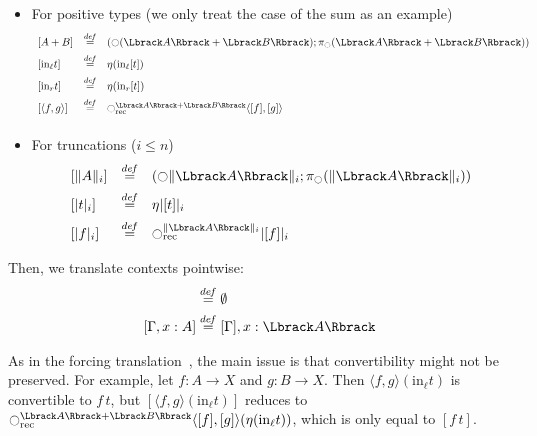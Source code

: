 \begin{itemize}
\item For positive types (we only treat the case of the sum as an example)
\[
\begin{array}{lcl}
\left[  A+B \right] &\defeq& \left( \modal(\Lbrack A \Rbrack + \Lbrack B
                        \Rbrack); \pi_\modal(\Lbrack A \Rbrack + \Lbrack B
                        \Rbrack)\right)\\[0.5em]
\left[  \mathrm{in}_\ell t \right] &\defeq& \eta (\mathrm{in}_\ell [t]) \\[0.5em]
\left[  \mathrm{in}_r t \right] &\defeq& \eta (\mathrm{in}_r [t]) \\[0.5em]
\left[ \langle f ,g\rangle\right] &\defeq& \modal_{\mathrm{rec}}^{\Lbrack A\Rbrack +
                                      \Lbrack B\Rbrack} \langle
                                      [f],[g]\rangle\\[0.5em]
\end{array}
\]
\item For truncations ($i\leqslant n$)
\[
\begin{array}{lcl}
  \left[  \|A\|_i \right] &\defeq& (\modal \| \Lbrack A\Rbrack  \|_i;
                                   \pi_\modal(\| \Lbrack A\Rbrack
                                   \|_i)) \\[0.5em]
  \left[ |t|_i \right] &\defeq& \eta |[t]|_i \\[0.5em]
  \left[ |f|_i \right] &\defeq& \modal_{\mathrm{rec}}^{\| \Lbrack
                                  A\Rbrack  \|_i} | [f] |_i
\end{array}
\]

\end{itemize}

Then, we translate contexts pointwise:
\begin{align*}
  [\emptyset] &\defeq \emptyset \\
  [\Gamma,x:A] &\defeq [\Gamma],x:\Lbrack A\Rbrack
\end{align*}

As in the forcing translation~\cite{jaber2012extending}, the main
issue is that convertibility might not be preserved. For
example, let $f:A \to X$ and $g:B\to X$. Then $\langle f,g\rangle
(\mathrm{in}_\ell t)$ is convertible to $f\,t$, but $[\langle f,g\rangle
(\mathrm{in}_\ell t)]$ reduces to $\modal_{\mathrm{rec}}^{\Lbrack A\Rbrack +
                                      \Lbrack
                                      B\Rbrack}\langle[f],[g]\rangle(\eta(\mathrm{in}_\ell
                                    t))$, which is only equal to $[f\,t]$.


